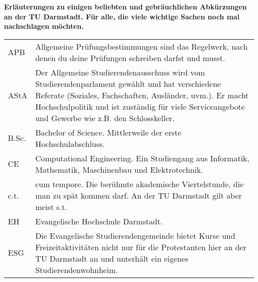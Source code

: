 
\textbf{Erläuterungen zu einigen beliebten und gebräuchlichen Abkürzungen an der TU Darmstadt. Für alle, die viele wichtige Sachen noch mal nachschlagen möchten.}

\begin{longtable}{p{20mm}p{85mm}}
    APB          & Allgemeine Prüfungsbestimmungen sind das Regelwerk, nach denen du deine Prüfungen schreiben darfst und musst.                                                                                                                                                           \\
    AStA         & Der Allgemeine Studierendenausschuss wird vom Studierendenparlament gewählt und hat verschiedene Referate (Soziales, Fachschaften, Ausländer, uvm.). Er macht Hochschulpolitik und ist zuständig für viele Serviceangebote und Gewerbe wie z.B. den Schlosskeller.      \\
    B.Sc.        & Bachelor of Science. Mittlerweile der erste Hochschulabschluss.                                                                                                                                                                                                         \\
    CE           & Computational Engineering. Ein Studiengang aus Informatik, Mathematik, Maschinenbau und Elektrotechnik.                                                                                                                                                                 \\
    c.t.         & cum tempore. Die berühmte akademische Viertelstunde, die man zu spät kommen darf. An der TU Darmstadt gilt aber meist s.t.                                                                                                                                              \\
    EH           & Evangelische Hochschule Darmstadt.                                                                                                                                                                                                                                      \\
    ESG          & Die Evangelische Studierendengemeinde bietet Kurse und Freizeitaktivitäten nicht nur für die Protestanten hier an der TU Darmstadt an und unterhält ein eigenes Studierendenwohnheim.                                                                                   \\

\end{longtable}
